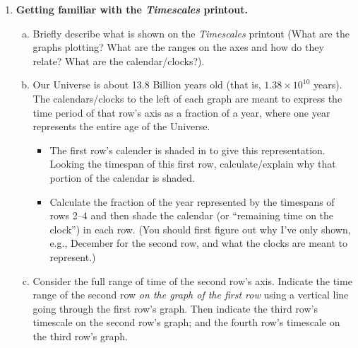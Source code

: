 \documentclass[12pt]{article}
\begin{document}
\begin{enumerate}

\item {\bf Getting familiar with the {\em Timescales} printout.}  
	\begin{enumerate}[(a)]
	\item Briefly describe what is shown on the {\em Timescales} printout (What are the graphs plotting? What are the ranges on the axes and how do they relate? What are the calendar/clocks?).
	\item Our Universe is about 13.8 Billion years old (that is, $1.38 \times 10^{10}$ years).  The calendars/clocks to the left of each graph are meant to express the time period of that row's axis as a fraction of a year, where one year represents the entire age of the Universe.  
		\begin{itemize}
		\item The first row's calender is shaded in to give this representation.  Looking the timespan of this first row, calculate/explain why that portion of the calendar is shaded.
		\item Calculate the fraction of the year represented by the timespans of rows 2--4 and then shade the calendar (or ``remaining time on the clock'') in each row.  (You should first figure out why I've only shown, e.g., December for the second row, and what the clocks are meant to represent.)
		\end{itemize}
	\item Consider the full range of time of the second row's axis.  Indicate the time range of the second row {\em on the graph of the first row} using a vertical line going through the first row's graph.  Then indicate the third row's timescale on the second row's graph; and the fourth row's timescale on the third row's graph.
	\end{enumerate}


\end{enumerate}
\end{document}
